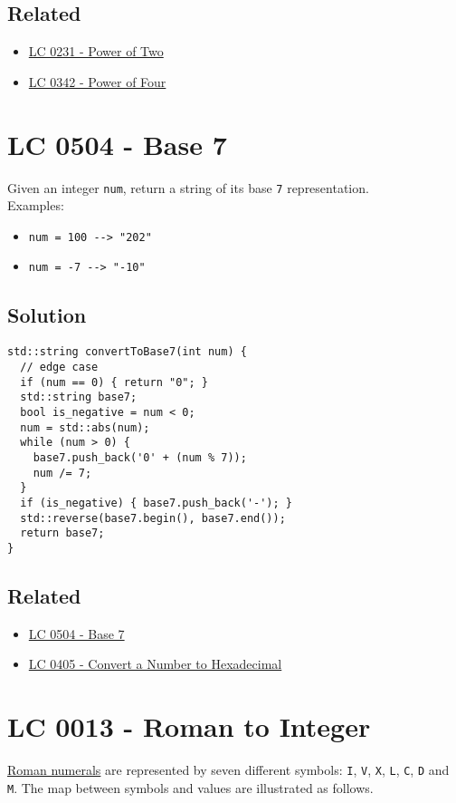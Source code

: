 \subsection*{Related}
\begin{itemize}
\item \hyperref[lc0231]{LC 0231 - Power of Two}
\item \hyperref[lc0342]{LC 0342 - Power of Four}
\end{itemize}

\section{LC 0504 - Base 7}\label{lc0504}
Given an integer {\colorbox{CodeBackground}{\lstinline|num|}}, return a string of its base {\colorbox{CodeBackground}{\lstinline|7|}} representation.\\

Examples:
\begin{itemize}
\item {\colorbox{CodeBackground}{\lstinline|num = 100 --> "202"|}}
\item {\colorbox{CodeBackground}{\lstinline|num = -7 --> "-10"|}}
\end{itemize}

\subsection*{Solution}
\begin{lstlisting}
std::string convertToBase7(int num) {
  // edge case
  if (num == 0) { return "0"; }
  std::string base7;
  bool is_negative = num < 0;
  num = std::abs(num);
  while (num > 0) {
    base7.push_back('0' + (num % 7));
    num /= 7;
  }
  if (is_negative) { base7.push_back('-'); }
  std::reverse(base7.begin(), base7.end());
  return base7;
}
\end{lstlisting}

\subsection*{Related}
\begin{itemize}
\item \hyperref[lc0504]{LC 0504 - Base 7}
\item \hyperref[lc0405]{LC 0405 - Convert a Number to Hexadecimal}
\end{itemize}

\section{LC 0013 - Roman to Integer}
\ul{Roman numerals} are represented by seven different symbols: {\colorbox{CodeBackground}{\lstinline|I|}}, {\colorbox{CodeBackground}{\lstinline|V|}}, {\colorbox{CodeBackground}{\lstinline|X|}}, {\colorbox{CodeBackground}{\lstinline|L|}}, {\colorbox{CodeBackground}{\lstinline|C|}}, {\colorbox{CodeBackground}{\lstinline|D|}} and {\colorbox{CodeBackground}{\lstinline|M|}}. The map between symbols and values are illustrated as follows.

